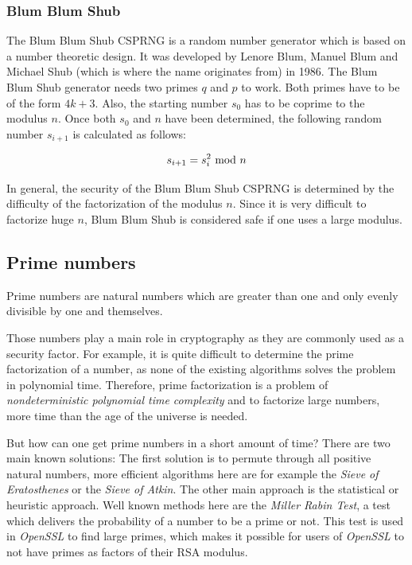 \subsubsection{Blum Blum Shub}

The Blum Blum Shub CSPRNG is a random number generator which is based on a number
theoretic design. It was developed by Lenore Blum, Manuel Blum and Michael Shub
(which is where the name originates from) in 1986. The Blum Blum Shub generator needs
two primes $q$ and $p$ to work. Both primes have to be of the form $4k + 3$. Also,
the starting number $s_0$ has to be coprime to the modulus $n$.
Once both $s_0$ and $n$ have been determined, the following random number $s_{i+1}$ is
calculated as follows:

$$s_{i+1} = s_{i}^2 \ \text{mod}\ n$$

In general, the security of the Blum Blum Shub CSPRNG is determined by the
difficulty of the factorization of the modulus $n$. Since it is very difficult
to factorize huge $n$, Blum Blum Shub is considered safe if one uses a large
modulus.

\subsection{Prime numbers}

Prime numbers are natural numbers which are greater than one and only evenly
divisible by one and themselves.

Those numbers play a main role in cryptography as they are commonly used
as a security factor. For example, it is quite difficult to determine the
prime factorization of a number, as none of the existing algorithms solves
the problem in polynomial time. Therefore, prime factorization is a problem
of \textit{nondeterministic polynomial time complexity} and to factorize
large numbers, more time than the age of the universe is needed.

But how can one get prime numbers in a short amount of time? There are two
main known solutions: The first solution is to permute through all positive
natural numbers, more efficient algorithms here are for example the
\textit{Sieve of Eratosthenes} or the \textit{Sieve of Atkin}. The other
main approach is the statistical or heuristic approach. Well known methods
here are the \textit{Miller Rabin Test}, a test which delivers the probability
of a number to be a prime or not. This test is used in \textit{OpenSSL} to
find large primes, which makes it possible for users of \textit{OpenSSL} to
not have primes as factors of their RSA modulus.

